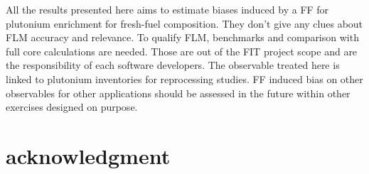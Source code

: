 All the results presented here aims to estimate biases induced by a \gls{FF} for
plutonium enrichment for fresh-fuel composition. They don't give any clues about
\gls{FLM} accuracy and relevance. To qualify \gls{FLM}, benchmarks and comparison with
full core calculations are needed. Those are out of the FIT project scope and
are the responsibility of each software developers. The observable treated here
is linked to plutonium inventories for reprocessing studies. \gls{FF} induced bias on
other observables for other applications should be assessed in the future within
other exercises designed on purpose.   

\section{acknowledgment}
